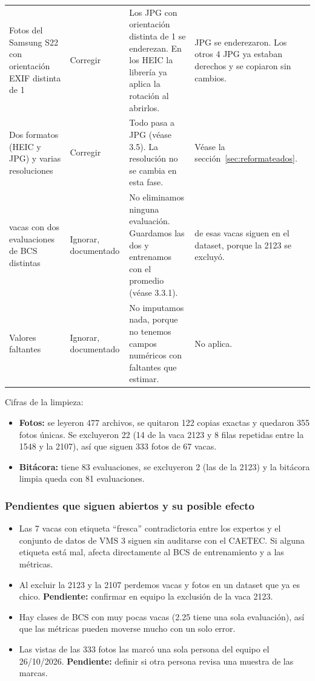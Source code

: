 \begin{table}[H]
\begin{tabularx}{\textwidth}{>{\raggedright\arraybackslash}p{}>{\raggedright\arraybackslash}p{}>{\raggedright\arraybackslash}X>{\raggedright\arraybackslash}p{}}
    \addlinespace
    Fotos del Samsung S22 con orientación EXIF distinta de 1 & Corregir & Los JPG con orientación distinta de 1 se enderezan. En los HEIC la librería ya aplica la rotación al abrirlos. & 20 JPG se enderezaron. Los otros 4 JPG ya estaban derechos y se copiaron sin cambios. \\
    \addlinespace
    Dos formatos (HEIC y JPG) y varias resoluciones & Corregir & Todo pasa a JPG (véase 3.5). La resolución no se cambia en esta fase. & Véase la sección~\ref{sec:reformateados}. \\
    \addlinespace
    14 vacas con dos evaluaciones de BCS distintas & Ignorar, documentado & No eliminamos ninguna evaluación. Guardamos las dos y entrenamos con el promedio (véase 3.3.1). & 13 de esas vacas siguen en el dataset, porque la 2123 se excluyó. \\
    \addlinespace
    Valores faltantes & Ignorar, documentado & No imputamos nada, porque no tenemos campos numéricos con faltantes que estimar. & No aplica. \\
    \bottomrule
  \end{tabularx}
\end{table}

Cifras de la limpieza:

\begin{itemize}
  \item \textbf{Fotos:} se leyeron 477 archivos, se quitaron 122 copias exactas y quedaron 355 fotos únicas. Se excluyeron 22 (14 de la vaca 2123 y 8 filas repetidas entre la 1548 y la 2107), así que siguen 333 fotos de 67 vacas.
  \item \textbf{Bitácora:} tiene 83 evaluaciones, se excluyeron 2 (las de la 2123) y la bitácora limpia queda con 81 evaluaciones.
\end{itemize}

\subsubsection*{Pendientes que siguen abiertos y su posible efecto}

\begin{itemize}
  \item Las 7 vacas con etiqueta ``fresca'' contradictoria entre los expertos y el conjunto de datos de VMS 3 siguen sin auditarse con el CAETEC. Si alguna etiqueta está mal, afecta directamente al BCS de entrenamiento y a las métricas.
  \item Al excluir la 2123 y la 2107 perdemos vacas y fotos en un dataset que ya es chico. \textbf{Pendiente:} confirmar en equipo la exclusión de la vaca 2123.
  \item Hay clases de BCS con muy pocas vacas (2.25 tiene una sola evaluación), así que las métricas pueden moverse mucho con un solo error.
  \item Las vistas de las 333 fotos las marcó una sola persona del equipo el 26/10/2026. \textbf{Pendiente:} definir si otra persona revisa una muestra de las marcas.
\end{itemize}
